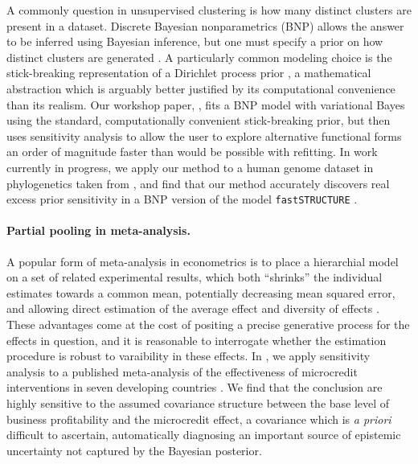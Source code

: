 A commonly question in unsupervised clustering is how many distinct clusters are
present in a dataset.  Discrete Bayesian nonparametrics (BNP) allows the answer
to be inferred using Bayesian inference, but one must specify a prior on how
distinct clusters are generated \citep{ghosh:2003:bnp,
gershman:2012:bnptutorial}.  A particularly common modeling choice is the
stick-breaking representation of a Dirichlet process prior
\citep{sethuraman:1994:constructivedp}, a mathematical abstraction which is
arguably better justified by its computational convenience than its realism. Our
workshop paper, \citet{giordano:2018:bnpsensitivity}, fits a BNP model with
variational Bayes \citep{blei:2006:dirichletbnp} using the standard,
computationally convenient stick-breaking prior, but then uses sensitivity
analysis to allow the user to explore alternative functional forms an order of
magnitude faster than would be possible with refitting. In work currently in
progress, we apply our method to a human genome dataset in phylogenetics taken
from \citep{huang:2011:haplotype}, and find that our method accurately discovers
real excess prior sensitivity in a BNP version of the model
\texttt{fastSTRUCTURE} \citep{raj:2014:faststructure}.


\paragraph{Partial pooling in meta-analysis.}

A popular form of meta-analysis in econometrics is to place a hierarchial model
on a set of related experimental results, which both ``shrinks'' the individual
estimates towards a common mean, potentially decreasing mean squared error, and
allowing direct estimation of the average effect and diversity of effects
\citep{rubin:1981:estimation,gelman:1992:inference}. These advantages come at
the cost of positing a precise generative process for the effects in question,
and it is reasonable to interrogate whether the estimation procedure is robust
to varaibility in these effects.  In \citet{giordano:2016:microcredit}, we apply
sensitivity analysis to a published meta-analysis of the effectiveness of
microcredit interventions in seven developing countries
\citep{meager:2019:microcredit}.  We find that the conclusion are highly
sensitive to the assumed covariance structure between the base level of business
profitability and the microcredit effect, a covariance which is {\em a priori}
difficult to ascertain, automatically diagnosing an important source of
epistemic uncertainty not captured by the Bayesian posterior.


